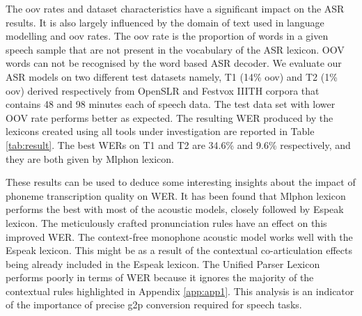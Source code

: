 The \gls{oov} rates and dataset characteristics have a significant impact on the ASR
results. It is also largely influenced by the domain of text used in language
modelling and \gls{oov} rates. The \gls{oov} rate is the proportion of words in a given speech
sample that are not present in the vocabulary of the ASR lexicon. OOV words can
not be recognised by the word based ASR decoder. We evaluate our ASR models on two different test datasets namely, T1 (14\% \gls{oov}) and T2 (1\% \gls{oov}) derived respectively from OpenSLR
\cite{he-etal-2020-open} and Festvox IIITH \cite{prahallad2012iiit} corpora
that contains 48 and 98 minutes each of speech data. The test data set with
lower OOV rate performs better as expected. The resulting WER produced by the
lexicons created using all tools under investigation are reported in Table
\ref{tab:result}. The best WERs on T1 and T2 are 34.6\% and 9.6\% respectively, and
they are both given by Mlphon lexicon.




These results can be used to deduce some interesting insights about the impact
of phoneme transcription quality on WER. It has been found that Mlphon lexicon
performs the best with most of the acoustic models, closely followed by Espeak
lexicon. The meticulously crafted pronunciation rules have an effect on this
improved WER. The context-free monophone acoustic model works well with the
Espeak lexicon. This might be as a result of the contextual co-articulation
effects being already included in the Espeak lexicon. The Unified Parser
Lexicon performs poorly in terms of WER because it ignores the majority of the
contextual rules highlighted in Appendix \ref{app:app1}. This analysis is an indicator of the importance of precise \gls{g2p} conversion
required for speech tasks. 


